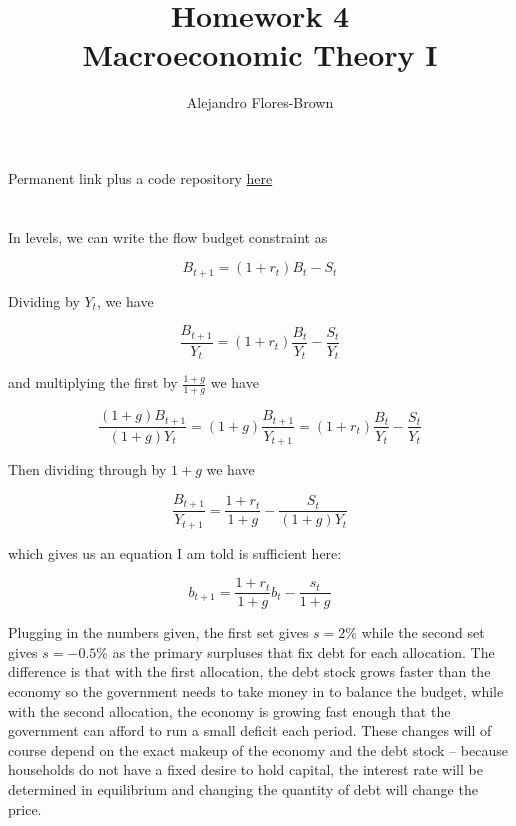 \documentclass[12pt, letterpaper, parskip = full]{article}
\title{Homework 4 \\ Macroeconomic Theory I}
\author{Alejandro Flores-Brown}
\begin{document}
	\maketitle

	Permanent link plus a code repository \href{https://github.com/AFB-TUV/Fall-2026/tree/main/Macro/Homework%204}{here}

	\section{}

	\subsection{}

	In levels, we can write the flow budget constraint as

	\[ B_{t+1} = (1+r_t) B_t - S_t    \]

	Dividing by \(Y_t\), we have 

	\[ \frac{B_{t+1}}{Y_t} = (1+r_t) \frac{B_t}{Y_t} - \frac{S_t}{Y_t}    \]

	and multiplying the first by \(\frac{1+g}{1+g}\) we have

	\[ \frac{(1+g) B_{t+1}}{(1+g) Y_t} = (1+g) \frac{B_{t+1}}{Y_{t+1}} = (1+r_t) \frac{B_t}{Y_t} - \frac{S_t}{Y_t}   \]

	Then dividing through by \(1 +g\) we have

	\[ \frac{B_{t+1}}{Y_{t+1}} = \frac{1+r_t}{1+g} - \frac{S_t}{(1+g) Y_t}    \]

	which gives us an equation I am told is sufficient here:

	\[ b_{t+1} = \frac{1+r_t}{1+g} b_t - \frac{s_t}{1+g}    \]

	Plugging in the numbers given, the first set gives \(s = 2\%\) while the second set gives \(s = -0.5\%\) as the primary surpluses that fix debt for each allocation. The difference is that with the first allocation, the debt stock grows faster than the economy so the government needs to take money in to balance the budget, while with the second allocation, the economy is growing fast enough that the government can afford to run a small deficit each period. These changes will of course depend on the exact makeup of the economy and the debt stock -- because households do not have a fixed desire to hold capital, the interest rate will be determined in equilibrium and changing the quantity of debt will change the price.

	\subsection{}
\end{document}
